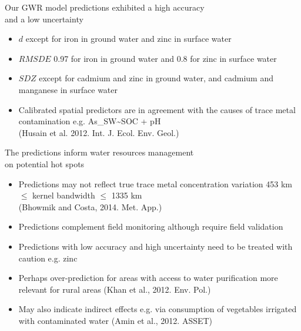 \documentclass[10pt, compress]{beamer}
\begin{document}

\begin{frame}{Our GWR model predictions exhibited a high accuracy \protect\\ and a low uncertainty}
      \begin{itemize}
        \item \alert{$d$ } except for iron in ground water and zinc in surface water
        \pause
        \item \alert{$RMSDE$ } 0.97 for iron in ground water and 0.8 for zinc in surface water
        \pause
        \item \alert{$SDZ$ } except for cadmium and zinc in ground water, and cadmium and manganese in surface water
        \pause
        \item \alert{Calibrated spatial predictors are in agreement with the causes of trace metal contamination} e.g. As\_SW\textasciitilde SOC + pH \\ \footnotesize (Husain et al. 2012. Int. J. Ecol. Env. Geol.)
      \end{itemize}
\end{frame}


\begin{frame}{The predictions inform water resources management \protect\\ on potential hot spots}
      \begin{itemize}
        \item \alert{Predictions may not reflect true trace metal concentration variation} 453 km $\leq$ kernel bandwidth $\leq$ 1335 km \\ \footnotesize (Bhowmik and Costa, 2014. Met. App.)\normalsize
        \pause
        \item \alert{Predictions complement field monitoring} although require field validation
        \pause
        \item \alert{Predictions with low accuracy and high uncertainty need to be treated with caution} e.g. zinc
        \pause
        \item \alert{Perhaps over-prediction for areas with access to water purification} more relevant for rural areas \footnotesize (Khan et al., 2012. Env. Pol.) \normalsize
        \pause
        \item \alert{May also indicate indirect effects} e.g. via consumption of vegetables irrigated with contaminated water \footnotesize (Amin et al., 2012. ASSET)\normalsize
      \end{itemize}
\end{frame}
\end{document}
